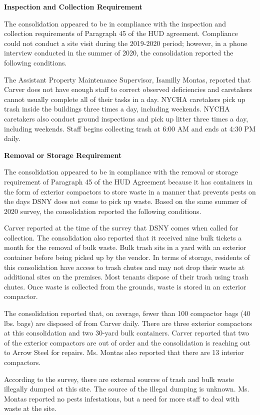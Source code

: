 

\textbf{Inspection and Collection Requirement}

The consolidation appeared to be in compliance with the inspection and collection requirements of Paragraph 45 of the HUD agreement. Compliance could not conduct a site visit during the 2019-2020 period; however, in a phone interview conducted in the summer of 2020, the consolidation reported the following conditions.

The Assistant Property Maintenance Supervisor, Isamilly Montas, reported that Carver does not have enough staff to correct observed deficiencies and caretakers cannot usually complete all of their tasks in a day. NYCHA caretakers pick up trash inside the buildings three times a day, including weekends. NYCHA caretakers also conduct ground inspections and pick up litter three times a day, including weekends. Staff begins collecting trash at 6:00 AM and ends at 4:30 PM daily.

\textbf{Removal or Storage Requirement}

The consolidation appeared to be in compliance with the  removal or storage requirement of Paragraph  45 of the HUD Agreement because it has containers in the form of exterior compactors to store waste in a manner that prevents pests on the days DSNY does not come to pick up waste. Based on the same summer of  2020 survey, the consolidation reported the following conditions.

Carver reported at the time of the survey that DSNY comes when called for collection. The consolidation also reported that it received nine bulk tickets a month for the removal of bulk waste. Bulk trash sits in a yard with an exterior container before being picked up by the vendor. In terms of storage, residents of this consolidation have access to trash chutes and may not drop their waste at additional sites on the premises. Most tenants dispose of their trash using trash chutes. Once waste is collected from the grounds, waste is stored in an exterior compactor. 

The consolidation reported that, on average, fewer than 100 compactor bags (40 lbs. bags) are disposed of from Carver daily. There are three exterior compactors at this consolidation and two 30-yard bulk containers. Carver reported that two of the exterior compactors are out of order and the consolidation  is reaching out to Arrow Steel for repairs. Ms. Montas also reported that there are 13 interior compactors.

According to the survey, there are external sources of trash and bulk waste illegally dumped at this site. The source of the illegal dumping is unknown. Ms. Montas reported no pests infestations, but a need for more staff to deal with waste at the site.
